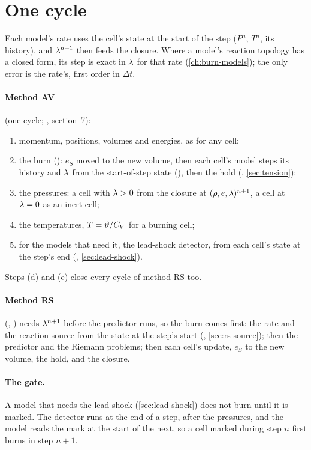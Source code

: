 \section{One cycle}
\label{sec:one-cycle}

Each model's rate uses the cell's state at the start of the step ($P^n$,
$T^n$, its history), and $\lambda^{n+1}$ then feeds the closure. Where a
model's reaction topology has a closed form, its step is exact in $\lambda$ for
that rate (\cref{ch:burn-models}); the only error is the rate's, first order
in $\Delta t$.

\paragraph{Method AV} (one cycle; , section~7):
\begin{enumerate}[label=(\alph*)]
\item momentum, positions, volumes and energies, as for any cell;
\item the burn (): $e_S$ moved to the new volume, then each
  cell's model steps its history and $\lambda$ from the start-of-step state
  (), then the hold (,
  \cref{sec:tension});
\item the pressures: a cell with $\lambda > 0$ from the closure at
  $(\rho, e, \lambda)^{n+1}$, a cell at $\lambda = 0$ as an inert cell;
\item the temperatures, $T = \vartheta/C_{V}$ for a burning cell;
\item for the models that need it, the lead-shock detector, from each
  cell's state at the step's end (,
  \cref{sec:lead-shock}).
\end{enumerate}
Steps (d) and (e) close every cycle of method RS too.

\paragraph{Method RS} (, ) needs $\lambda^{n+1}$
before the predictor runs, so the burn comes first: the rate and the
reaction source from the state at the step's start
(, \cref{sec:rs-source}); then the predictor and the
Riemann problems; then each cell's update, $e_S$ to the new volume, the
hold, and the closure.

\paragraph{The gate.} A model that needs the lead shock
(\cref{sec:lead-shock}) does not burn until it is marked. The detector runs
at the end of a step, after the pressures, and the model reads the mark at
the start of the next, so a cell marked during step $n$ first burns in step
$n + 1$.

